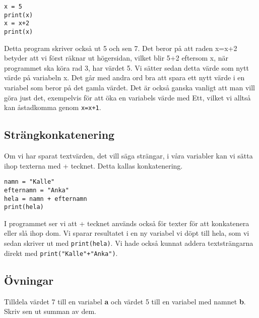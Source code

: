 \begin{minipage}{\linewidth}
\begin{lstlisting}[title=Användning av samma variabel två gånger]
x = 5
print(x)
x = x+2
print(x)
\end{lstlisting}
\end{minipage}

Detta program skriver också ut 5 och sen 7. 
Det beror på att raden x=x+2 betyder att vi först räknar ut högersidan, 
vilket blir 5+2 eftersom x, när programmet ska köra rad 3, har värdet 5. 
Vi sätter sedan detta värde som nytt värde på variabeln x.
Det går med andra ord bra att spara ett nytt värde i en variabel som beror på det gamla värdet.
Det är också ganska vanligt att man vill göra just det, exempelvis för att öka en variabels värde med Ett, 
vilket vi alltså kan åstadkomma genom \texttt{x=x+1}.

\subsection{Strängkonkatenering}
Om vi har sparat textvärden, det vill säga strängar, i våra variabler kan vi sätta ihop texterna med + tecknet.
Detta kallas konkatenering.

\begin{lstlisting}[title=Konkatenering av strängar]
namn = "Kalle"
efternamn = "Anka"
hela = namn + efternamn
print(hela)
\end{lstlisting}

I programmet ser vi att + tecknet används också för texter för att konkatenera eller slå ihop dom. 
Vi sparar resultatet i en ny variabel vi döpt till hela, som vi sedan skriver ut med \texttt{print(hela)}.
Vi hade också kunnat addera textsträngarna direkt med \texttt{print("Kalle"+\string"Anka")}.


\subsection{Övningar}
\begin{exercise}
Tilldela värdet 7 till en variabel \textbf{a} och värdet 5 till en variabel med namnet \textbf{b}.
Skriv sen ut summan av dem.
\end{exercise}

